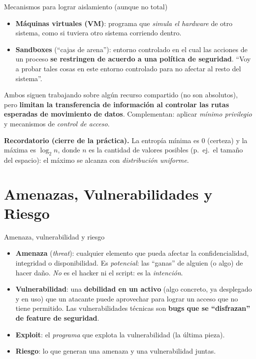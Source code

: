 \documentclass[11pt,a4paper]{article}
\begin{document}
\begin{defbox}{Mecanismos para lograr aislamiento (aunque no total)}
\begin{itemize}[leftmargin=1.4em,itemsep=2pt]
  \item \textbf{Máquinas virtuales (VM)}: programa que \emph{simula el hardware} de otro
        sistema, como si tuviera otro sistema corriendo dentro.
  \item \textbf{Sandboxes} (``cajas de arena''): entorno controlado en el cual las acciones de
        un proceso \textbf{se restringen de acuerdo a una política de seguridad}. ``Voy a
        probar tales cosas en este entorno controlado para no afectar al resto del sistema''.
\end{itemize}
Ambos siguen trabajando sobre algún recurso compartido (no son absolutos), pero
\textbf{limitan la transferencia de información al controlar las rutas esperadas de movimiento
de datos}. Complementan: aplicar \emph{mínimo privilegio} y mecanismos de \emph{control de
acceso}.
\end{defbox}

\begin{slidebox}
\textbf{Recordatorio (cierre de la práctica).} La entropía mínima es $0$ (certeza) y la
máxima es $\log_2 n$, donde $n$ es la cantidad de valores posibles (p.\ ej.\ el tamaño del
espacio): el máximo se alcanza con \emph{distribución uniforme}.
\end{slidebox}

\section{Amenazas, Vulnerabilidades y Riesgo}

\begin{defbox}{Amenaza, vulnerabilidad y riesgo}
\begin{itemize}[leftmargin=1.4em,itemsep=2pt]
  \item \textbf{Amenaza} (\emph{threat}): cualquier elemento que pueda afectar la
        confidencialidad, integridad o disponibilidad. Es \emph{potencial}: las ``ganas'' de
        alguien (o algo) de hacer daño. \emph{No} es el hacker ni el script: es la
        \emph{intención}.
  \item \textbf{Vulnerabilidad}: una \textbf{debilidad en un activo} (algo concreto, ya
        desplegado y en uso) que un atacante puede aprovechar para lograr un acceso que no
        tiene permitido. Las vulnerabilidades técnicas son \textbf{bugs que se ``disfrazan'' de
        feature de seguridad}.
  \item \textbf{Exploit}: el \emph{programa} que explota la vulnerabilidad (la última pieza).
  \item \textbf{Riesgo}: lo que generan una amenaza y una vulnerabilidad juntas.
\end{itemize}
\end{defbox}
\end{document}
